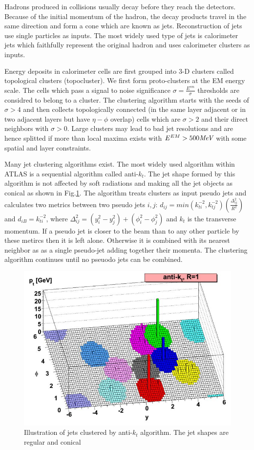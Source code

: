 Hadrons produced in collisions usually decay before they reach the detectors. Because of the initial momentum of the hadron, the decay products travel in the same direction and form a cone which are known as jets. Reconstruction of jets use single particles as inputs. The most widely used type of jets is calorimeter jets which faithfully represent the original hadron and uses calorimeter clusters as inputs. 

Energy deposits in calorimeter cells are first grouped into 3-D clusters called topological clusters (topocluster)\cite{PERF-2014-07}. We first form proto-clusters at the EM energy scale. The cells which pass a signal to noise significance $\sigma=\frac{E^{em}}{\sigma}$ thresholds are considred to belong to a cluster. The clustering algorithm starts with the seeds of $\sigma>4$ and then collects topologically connected (in the same layer adjacent or in two adjacent layers but have $\eta- \phi$ overlap) cells which are $\sigma>2$ and their direct neighbors with $\sigma>0$. Large clusters may lead to bad jet resolutions and are hence splitted if more than local maxima exists with $E^{EM}>500 \textit{MeV}$ with some spatial and layer constraints.

Many jet clustering algorithms exist. The most widely used algorithm within ATLAS is a sequential algorithm called anti-$k_t$\cite{Cacciari:2008gp}. The jet shape formed by this algorithm is not affected by soft radiations and making all the jet objects as conical as shown in Fig.\ref{fig:reco-antikt}. The algorithm treats clusters as input pseudo jets and calculates two metrics between two pseudo jets $i,j$: $d_{ij}=min(k^{-2}_{ti},k^{-2}_{tj})(\frac{\Delta^2_{ij}}{R^2})$ and $d_{iB}=k^{-2}_{ti}$, where $\Delta^2_{ij}=(y_i^2-y_j^2)+(\phi_i^2-\phi_j^2)$ and $k_t$ is the transverse momentum. If a pseudo jet is closer to the beam than to any other particle by these metircs then it is left alone. Otherwise it is combined with its nearest neighbor as as a single pseudo-jet adding together their momenta. The clustering algorithm continues until no pseuodo jets can be combined.

\begin{figure}[htpb!]
\begin{center}
  \includegraphics[width=0.55\linewidth]{figures/Reco/Antikt}
\caption{Illustration of jets clustered by anti-$k_t$ algorithm. The jet shapes are regular and conical}
\label{fig:reco-antikt}
\end{center}
\end{figure}

